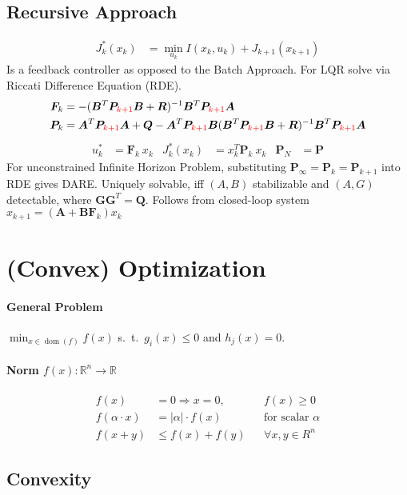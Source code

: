 \documentclass[landscape,a4paper,8pt]{scrartcl}
\renewcommand{\implies}{\Rightarrow}
\newcommand{\remph}[1]{{\textcolor{red}{#1}}}
\newcommand{\R}{\mathbb R}
\newcommand\vA{\bm{A}}
\newcommand\vB{\bm{B}}
\newcommand\vF{\bm{F}}
\newcommand\vG{\bm{G}}
\newcommand\vP{\bm{P}}
\newcommand\vQ{\bm{Q}}
\newcommand\vR{\bm{R}}
\DeclareMathOperator\dom{dom}
\begin{document}
\begin{multicols*}{3}
\subsection{Recursive Approach}
\begin{align*}
J_k^*(x_k) & = \min_{u_k} I(x_k, u_k) + J_{k+1}(x_{k+1})
\end{align*}
Is a feedback controller as opposed to the Batch Approach.
For LQR solve via Riccati Difference Equation (RDE).
\begin{align*}
 \vF_k & = -(\vB^T\vP_\remph{k+1}\vB + \vR)^{-1}\vB^T\vP_\remph{k+1}\vA \\
 \vP_k & = \vA^T\vP_\remph{k+1}\vA + \vQ - \vA^T\vP_\remph{k+1}\vB(\vB^T\vP_\remph{k+1}\vB + \vR)^{-1}\vB^T\vP_\remph{k+1}\vA
\end{align*}
\begin{align*}
 u_k^* & = \vF_k\ x_k  & J_k^*(x_k) & = x_k^T\vP_k\ x_k & \vP_N & = \vP
\end{align*}
For unconstrained Infinite Horizon Problem, substituting $\vP_\infty = \vP_k = \vP_{k+1}$ into RDE gives DARE.
Uniquely solvable, iff $(A,B)$ stabilizable and $(A, G)$ detectable, where $\vG\vG^T = \vQ$.
Follows from closed-loop system $x_{k+1} = (\vA + \vB\vF_k)x_k$

\section{(Convex) Optimization}

\paragraph{General Problem}
$\min_{x \in \dom(f)} f(x)$ s.\ t.\ $g_i(x) \leq 0$ and $h_j(x) = 0.$

\paragraph{Norm $f(x): \R^n \rightarrow \R$}
\begin{align*}
f(x) & = 0 \implies x = 0, && f(x) \geq 0 \\
f(\alpha \cdot x) & = |\alpha|\cdot f(x) && \text{for scalar } \alpha \\
f(x+y) & \leq f(x) + f(y) && \forall x, y \in R^n
\end{align*}

\subsection{Convexity}

\end{multicols*}
\end{document}

